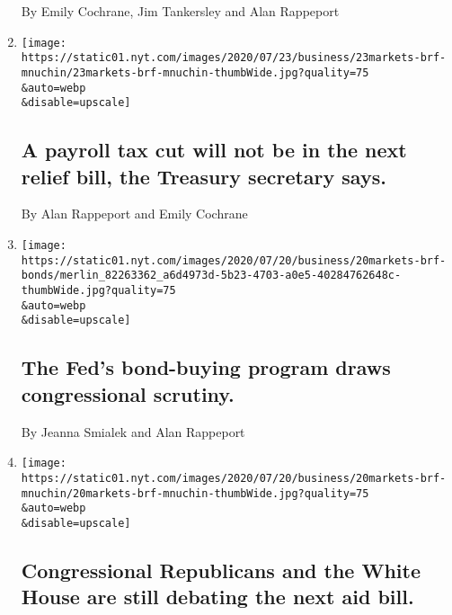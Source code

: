 \begin{enumerate}
  By Emily Cochrane, Jim Tankersley and Alan Rappeport
\item
  \href{/live/2020/07/23/business/stock-market-today-coronavirus/a-payroll-tax-cut-will-not-be-in-the-next-relief-bill-the-treasury-secretary-says}{}

  \texttt{[image: https://static01.nyt.com/images/2020/07/23/business/23markets-brf-mnuchin/23markets-brf-mnuchin-thumbWide.jpg?quality=75\\\&auto=webp\\\&disable=upscale]}

  \hypertarget{a-payroll-tax-cut-will-not-be-in-the-next-relief-bill-the-treasury-secretary-says}{%
  \subsection{A payroll tax cut will not be in the next relief bill, the
  Treasury secretary
  says.}\label{a-payroll-tax-cut-will-not-be-in-the-next-relief-bill-the-treasury-secretary-says}}

  By Alan Rappeport and Emily Cochrane
\item
  \href{/live/2020/07/20/business/stock-market-today-coronavirus/the-feds-bond-buying-program-draws-congressional-scrutiny}{}

  \texttt{[image: https://static01.nyt.com/images/2020/07/20/business/20markets-brf-bonds/merlin\_82263362\_a6d4973d-5b23-4703-a0e5-40284762648c-thumbWide.jpg?quality=75\\\&auto=webp\\\&disable=upscale]}

  \hypertarget{the-feds-bond-buying-program-draws-congressional-scrutiny}{%
  \subsection{The Fed's bond-buying program draws congressional
  scrutiny.}\label{the-feds-bond-buying-program-draws-congressional-scrutiny}}

  By Jeanna Smialek and Alan Rappeport
\item
  \href{/live/2020/07/20/business/stock-market-today-coronavirus/congressional-republicans-and-the-white-house-are-still-debating-the-next-aid-bill}{}

  \texttt{[image: https://static01.nyt.com/images/2020/07/20/business/20markets-brf-mnuchin/20markets-brf-mnuchin-thumbWide.jpg?quality=75\\\&auto=webp\\\&disable=upscale]}

  \hypertarget{congressional-republicans-and-the-white-house-are-still-debating-the-next-aid-bill}{%
  \subsection{Congressional Republicans and the White House are still
  debating the next aid
  bill.}\label{congressional-republicans-and-the-white-house-are-still-debating-the-next-aid-bill}}


\end{enumerate}
